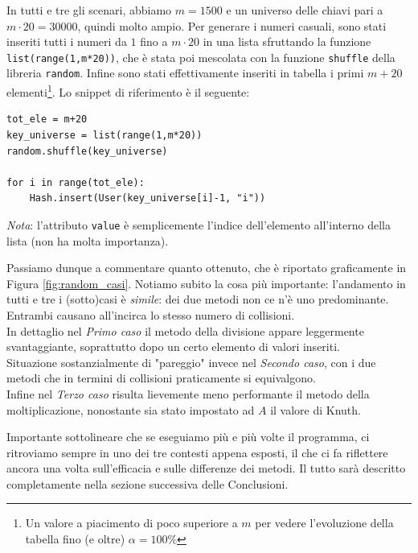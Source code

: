 In tutti e tre gli scenari, abbiamo $m = 1500$ e un universo delle chiavi pari a $m \cdot 20=30000$, quindi molto ampio.
Per generare i numeri casuali, sono stati inseriti tutti i numeri da $1$ fino a $m\cdot20$ in una lista sfruttando la funzione \verb|list(range(1,m*20))|, che è stata poi mescolata con la funzione \verb|shuffle| della libreria \verb|random|.
Infine sono stati effettivamente inseriti in tabella i primi $m+20$ elementi\footnote{Un valore a piacimento di poco superiore a $m$ per vedere l'evoluzione della tabella fino (e oltre) $\alpha=100\%$}.
Lo snippet di riferimento è il seguente:
\lstset{
      basicstyle=\small,
      xleftmargin=.1\textwidth,
}
\begin{lstlisting}
tot_ele = m+20
key_universe = list(range(1,m*20))
random.shuffle(key_universe)

for i in range(tot_ele):
	Hash.insert(User(key_universe[i]-1, "i"))
\end{lstlisting}

\textit{Nota}: l'attributo \verb|value| è semplicemente l'indice dell'elemento all'interno della lista (non ha molta importanza).

Passiamo dunque a commentare quanto ottenuto, che è riportato graficamente in Figura \ref{fig:random_casi}.
Notiamo subito la cosa più importante: l'andamento in tutti e tre i (sotto)casi è \textit{simile}: dei due metodi non ce n'è uno predominante. Entrambi causano all'incirca lo stesso numero di collisioni.
\\In dettaglio nel \textit{Primo caso} il metodo della divisione appare leggermente svantaggiante, soprattutto dopo un certo elemento di valori inseriti.
\\ Situazione sostanzialmente di "pareggio" invece nel \textit{Secondo caso}, con i due metodi che in termini di collisioni praticamente si equivalgono.
\\ Infine nel \textit{Terzo caso} risulta lievemente meno performante il metodo della moltiplicazione, nonostante sia stato impostato ad $A$ il valore di Knuth.

Importante sottolineare che se eseguiamo più e più volte il programma, ci ritroviamo sempre in uno dei tre contesti appena esposti, il che ci fa riflettere ancora una volta sull'efficacia e sulle differenze dei metodi. Il tutto sarà descritto completamente nella sezione successiva delle Conclusioni.